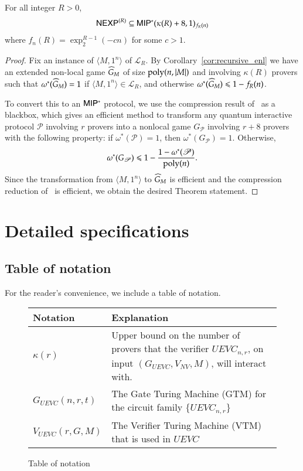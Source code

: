 \begin{theorem}[Main]
	For all integer $R > 0$, 
	\[
		{\sf NEXP}^{(R)} \subseteq {\sf MIP^*}(\kappa(R)+8,1)_{f_R(n)}
	\]
	 where $f_n(R) = \exp^{R-1}_2(-cn)$ for some $c > 1$.
\end{theorem}
\begin{proof}
	Fix an instance of $\langle M,1^n \rangle$ of $\mathcal{L}_R$. By Corollary~\ref{cor:recursive_enl} we have an extended non-local game $\widehat{G}_M$  of size $\operatorname{poly}(n,|M|)$ and involving $\kappa(R)$ provers such that $\omega^*(\widehat{G}_M) = 1$ if $\langle M,1^n \rangle \in \mathcal{L}_R$, and otherwise $\omega^*(\widehat{G}_M) \leqslant 1 - f_R(n)$. 
	
	To convert this to an ${\sf MIP^*}$ protocol, we use the compression result of~\cite{ji2016compression} as a blackbox, which gives an efficient method to transform any quantum interactive protocol $\mathscr{P}$ involving $r$ provers into a nonlocal game $G_{\mathscr{P}}$ involving $r + 8$ provers with the following property: if $\omega^*(\mathscr{P}) = 1$, then $\omega^*(G_{\mathscr{P}}) = 1$. Otherwise, 
	\[
		\omega^*(G_{\mathscr{P}}) \leqslant 1 - \frac{1 - \omega^*(\mathscr{P})}{\operatorname{poly}(n)}. 
	\]
	Since the transformation from $\langle M,1^n \rangle$ to $\widehat{G}_M$ is efficient and the compression reduction of~\cite{ji2016compression} is efficient, we obtain the desired Theorem statement.
\end{proof}

\section{Detailed specifications}

\subsection{Table of notation}

For the reader's convenience, we include a table of notation.

\begin{figure}[H]
\begin{center}
    \begin{tabular}{ | l | p{10cm} |}
    \hline
    \textbf{Notation} & \textbf{Explanation} \\ \hline
    $\kappa(r)$ 		& Upper bound on the number of provers that the verifier $UEVC_{n,r}$, on input $(G_{UEVC},V_{NV},M)$, will interact with.  \\ \hline
    
    $G_{UEVC}(n,r,t)$ 			& The Gate Turing Machine (GTM) for the circuit family $\{ UEVC_{n,r} \}$ \\ \hline
    
    $V_{UEVC}(r,G,M)$			& The Verifier Turing Machine (VTM) that is used in $UEVC$ \\ \hline
    \end{tabular}
\end{center}
\caption{Table of notation}
\end{figure}

